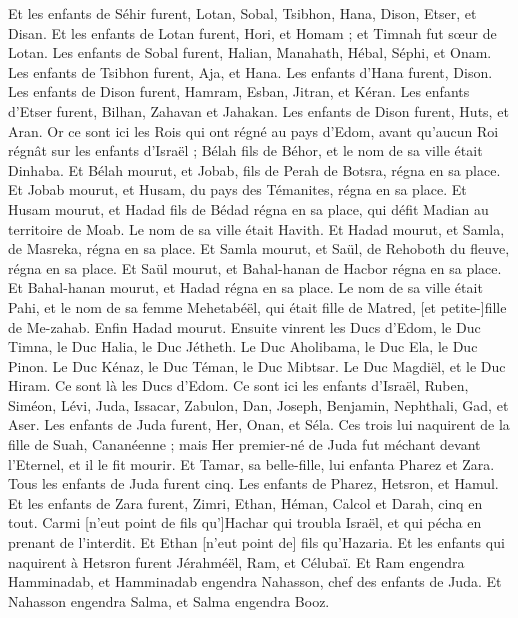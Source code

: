 \begin{multicols}{2}
Et les enfants de Séhir furent, Lotan, Sobal, Tsibhon, Hana, Dison, Etser, et Disan.
Et les enfants de Lotan furent, Hori, et Homam ; et Timnah fut sœur de Lotan.
Les enfants de Sobal furent, Halian, Manahath, Hébal, Séphi, et Onam. Les enfants de Tsibhon furent, Aja, et Hana.
Les enfants d'Hana furent, Dison. Les enfants de Dison furent, Hamram, Esban, Jitran, et Kéran.
Les enfants d'Etser furent, Bilhan, Zahavan et Jahakan. Les enfants de Dison furent, Huts, et Aran.
Or ce sont ici les Rois qui ont régné au pays d'Edom, avant qu'aucun Roi régnât sur les enfants d'Israël ; Bélah fils de Béhor, et le nom de sa ville était Dinhaba.
Et Bélah mourut, et Jobab, fils de Perah de Botsra, régna en sa place.
Et Jobab mourut, et Husam, du pays des Témanites, régna en sa place.
Et Husam mourut, et Hadad fils de Bédad régna en sa place, qui défit Madian au territoire de Moab. Le nom de sa ville était Havith.
Et Hadad mourut, et Samla, de Masreka, régna en sa place.
Et Samla mourut, et Saül, de Rehoboth du fleuve, régna en sa place.
Et Saül mourut, et Bahal-hanan de Hacbor régna en sa place.
Et Bahal-hanan mourut, et Hadad régna en sa place. Le nom de sa ville était Pahi, et le nom de sa femme Mehetabéël, qui était fille de Matred, [et petite-]fille de Me-zahab.
Enfin Hadad mourut. Ensuite vinrent les Ducs d'Edom, le Duc Timna, le Duc Halia, le Duc Jétheth.
Le Duc Aholibama, le Duc Ela, le Duc Pinon.
Le Duc Kénaz, le Duc Téman, le Duc Mibtsar.
Le Duc Magdiël, et le Duc Hiram. Ce sont là les Ducs d'Edom.
\VerseOne{}Ce sont ici les enfants d'Israël, Ruben, Siméon, Lévi, Juda, Issacar, Zabulon,
Dan, Joseph, Benjamin, Nephthali, Gad, et Aser.
Les enfants de Juda furent, Her, Onan, et Séla. Ces trois lui naquirent de la fille de Suah, Cananéenne ; mais Her premier-né de Juda fut méchant devant l'Eternel, et il le fit mourir.
Et Tamar, sa belle-fille, lui enfanta Pharez et Zara. Tous les enfants de Juda furent cinq.
Les enfants de Pharez, Hetsron, et Hamul.
Et les enfants de Zara furent, Zimri, Ethan, Héman, Calcol et Darah, cinq en tout.
Carmi [n'eut point de fils qu']Hachar qui troubla Israël, et qui pécha en prenant de l'interdit.
Et Ethan [n'eut point de] fils qu'Hazaria.
Et les enfants qui naquirent à Hetsron furent Jérahméël, Ram, et Célubaï.
Et Ram engendra Hamminadab, et Hamminadab engendra Nahasson, chef des enfants de Juda.
Et Nahasson engendra Salma, et Salma engendra Booz.

\end{multicols}
